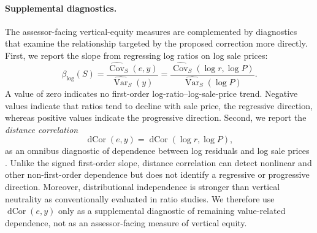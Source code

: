 \documentclass[10pt]{article}
\theoremstyle{definition}
\newcommand{\1}{\mathbf{1}}
\begin{document}
{
\color{impGreen}
\paragraph{Supplemental diagnostics.}
The assessor-facing vertical-equity measures are complemented by diagnostics
that examine the relationship targeted by the proposed correction more
directly. First, we report the slope from regressing log ratios on log sale
prices:
\begin{equation}
\label{eq:log_ratio_slope}
\beta_{\log}(S)
=
\frac{
\widehat{\operatorname{Cov}}_S(e,y)
}{
\widehat{\operatorname{Var}}_S(y)
}
=
\frac{
\widehat{\operatorname{Cov}}_S(\log r,\log P)
}{
\widehat{\operatorname{Var}}_S(\log P)
}.
\end{equation}
A value of zero indicates no first-order log-ratio--log-sale-price trend.
Negative values indicate that ratios tend to decline with sale price, the
regressive direction, whereas positive values indicate the progressive
direction. 
Second, we report the \emph{distance correlation}
\begin{equation}
\label{eq:dcor_diagnostic}
\operatorname{dCor}(e,y)
=
\operatorname{dCor}(\log r,\log P),
\end{equation}
as an omnibus diagnostic of dependence between log residuals and log sale
prices \cite{SzekelyRizzoBakirov2007}. Unlike the signed first-order slope,
distance correlation can detect nonlinear and other non-first-order
dependence but does not identify a regressive or progressive direction.
Moreover, distributional independence is stronger than vertical neutrality
as conventionally evaluated in ratio studies. We therefore use
$\operatorname{dCor}(e,y)$ only as a supplemental diagnostic of remaining
value-related dependence, not as an assessor-facing measure of vertical
equity.
}
\end{document}
